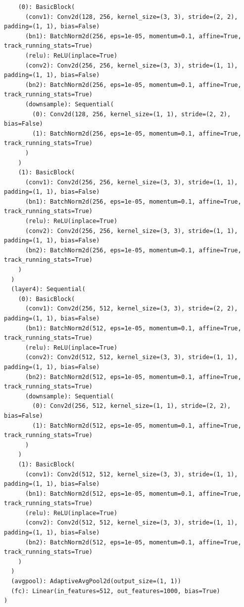 \documentclass{article}
\begin{document}
\begin{verbatim}
    (0): BasicBlock(
      (conv1): Conv2d(128, 256, kernel_size=(3, 3), stride=(2, 2), padding=(1, 1), bias=False)
      (bn1): BatchNorm2d(256, eps=1e-05, momentum=0.1, affine=True, track_running_stats=True)
      (relu): ReLU(inplace=True)
      (conv2): Conv2d(256, 256, kernel_size=(3, 3), stride=(1, 1), padding=(1, 1), bias=False)
      (bn2): BatchNorm2d(256, eps=1e-05, momentum=0.1, affine=True, track_running_stats=True)
      (downsample): Sequential(
        (0): Conv2d(128, 256, kernel_size=(1, 1), stride=(2, 2), bias=False)
        (1): BatchNorm2d(256, eps=1e-05, momentum=0.1, affine=True, track_running_stats=True)
      )
    )
    (1): BasicBlock(
      (conv1): Conv2d(256, 256, kernel_size=(3, 3), stride=(1, 1), padding=(1, 1), bias=False)
      (bn1): BatchNorm2d(256, eps=1e-05, momentum=0.1, affine=True, track_running_stats=True)
      (relu): ReLU(inplace=True)
      (conv2): Conv2d(256, 256, kernel_size=(3, 3), stride=(1, 1), padding=(1, 1), bias=False)
      (bn2): BatchNorm2d(256, eps=1e-05, momentum=0.1, affine=True, track_running_stats=True)
    )
  )
  (layer4): Sequential(
    (0): BasicBlock(
      (conv1): Conv2d(256, 512, kernel_size=(3, 3), stride=(2, 2), padding=(1, 1), bias=False)
      (bn1): BatchNorm2d(512, eps=1e-05, momentum=0.1, affine=True, track_running_stats=True)
      (relu): ReLU(inplace=True)
      (conv2): Conv2d(512, 512, kernel_size=(3, 3), stride=(1, 1), padding=(1, 1), bias=False)
      (bn2): BatchNorm2d(512, eps=1e-05, momentum=0.1, affine=True, track_running_stats=True)
      (downsample): Sequential(
        (0): Conv2d(256, 512, kernel_size=(1, 1), stride=(2, 2), bias=False)
        (1): BatchNorm2d(512, eps=1e-05, momentum=0.1, affine=True, track_running_stats=True)
      )
    )
    (1): BasicBlock(
      (conv1): Conv2d(512, 512, kernel_size=(3, 3), stride=(1, 1), padding=(1, 1), bias=False)
      (bn1): BatchNorm2d(512, eps=1e-05, momentum=0.1, affine=True, track_running_stats=True)
      (relu): ReLU(inplace=True)
      (conv2): Conv2d(512, 512, kernel_size=(3, 3), stride=(1, 1), padding=(1, 1), bias=False)
      (bn2): BatchNorm2d(512, eps=1e-05, momentum=0.1, affine=True, track_running_stats=True)
    )
  )
  (avgpool): AdaptiveAvgPool2d(output_size=(1, 1))
  (fc): Linear(in_features=512, out_features=1000, bias=True)
)
\end{verbatim}
\end{document}

